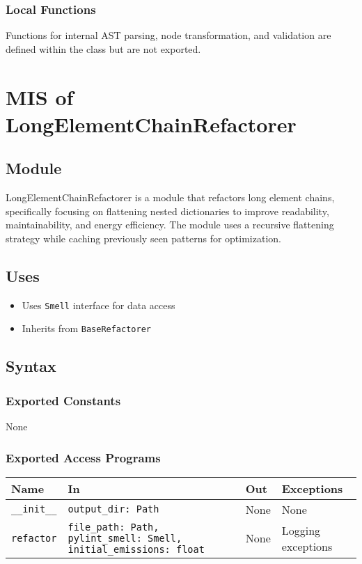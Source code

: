 \documentclass[12pt, titlepage]{article}
\begin{document}
\subsubsection{Local Functions}
Functions for internal AST parsing, node transformation, and validation are defined within the class but are not exported.
  
\newpage  

\section{MIS of LongElementChainRefactorer}

\subsection{Module}

LongElementChainRefactorer is a module that refactors long element chains, specifically focusing on flattening nested dictionaries to improve readability, maintainability, and energy efficiency. The module uses a recursive flattening strategy while caching previously seen patterns for optimization.

\subsection{Uses}

\begin{itemize}
    \item Uses \texttt{Smell} interface for data access
    \item Inherits from \texttt{BaseRefactorer}
\end{itemize}

\subsection{Syntax}

\subsubsection{Exported Constants}
None

\subsubsection{Exported Access Programs}

\begin{center}
\begin{tabular}{|p{3cm}|p{5cm}|p{2cm}|p{3cm}|}
\hline
\textbf{Name} & \textbf{In} & \textbf{Out} & \textbf{Exceptions} \\
\hline
\texttt{\_\_init\_\_} & \texttt{output\_dir: Path} & None & None \\
\hline
\texttt{refactor} & \texttt{file\_path: Path, pylint\_smell: Smell, initial\_emissions: float} & None & Logging exceptions \\
\hline
\end{tabular}
\end{center}
\end{document}
